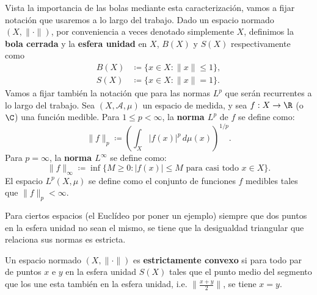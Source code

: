 Vista la importancia de las bolas mediante esta caracterización, vamos a fijar notación que usaremos a lo largo del trabajo. Dado un espacio normado $ (X, \| \cdot \|) $, por conveniencia a veces denotado simplemente $ X $, definimos la \textbf{bola cerrada} y la \textbf{esfera unidad} en $ X $, $ B(X) $ y $ S(X) $ respectivamente como
\begin{equation}
\begin{split}
    B(X) &\coloneq \{x \in X \colon \| x \| \leq 1 \}, \\
    S(X) &\coloneq \{x \in X \colon \| x \| = 1 \}.
\end{split}
\end{equation}
Vamos a fijar también la notación que para las normas $ L^p $ que serán recurrentes a lo largo del trabajo. Sea  $(X, \mathcal{A}, \mu) $ un espacio de medida, y sea $f: X \to \R$ (o$\C$) una función medible. Para $1 \leq p < \infty$, la \textbf{norma $L^p$} de $f$ se define como:
\begin{equation}
    \|f\|_p \coloneq \left( \int_X |f(x)|^p \, d\mu(x) \right)^{1/p}.
\end{equation}
Para $p = \infty$, la \textbf{norma $L^\infty$} se define como:
\begin{equation}
\|f\|_\infty \coloneq \inf \{ M \geq 0 : |f(x)| \leq M \text{ para casi todo } x \in X \}.
\end{equation}
El espacio $L^p(X, \mu)$ se define como el conjunto de funciones $f$ medibles tales que $\|f\|_p < \infty$.

Para ciertos espacios (el Euclídeo por poner un ejemplo) siempre que dos puntos en la esfera unidad no sean el mismo, se tiene que la desigualdad triangular que relaciona sus normas es estricta. 

\begin{definition}
    Un espacio normado $ (X, \| \cdot \|) $ es {\bf estrictamente convexo} si para todo par de puntos $ x $ e $ y $ en la esfera unidad $ S(X) $ tales que el punto medio del segmento que los une esta también en la esfera unidad, i.e. $\| \frac{x+y}{2}\| $, se tiene $ x = y $.
\end{definition}


